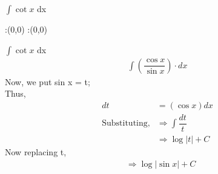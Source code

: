 



\question[3] $\int \cot x $ dx


\watchout

\ifprintanswers
  \begin{marginfigure}
      :(0,0)
      :(0,0)
    \figdrawbegin{}
      \figdrawline [100,101]
    \figdrawend
    \figvisu{\figBoxA}{}{%
    }
    \centerline{\box\figBoxA}
  \end{marginfigure}
\fi 

\begin{solution}[\halfpage]
$\int \cot x $ dx
\begin{align}
\int \left( \dfrac{\cos x}{\sin x} \right) \cdot dx
\end{align}
Now, we put sin x = t;\\
Thus,
\begin{align}
dt &= (\cos x)  dx\\
\text {Substituting},
&\Rightarrow \int \dfrac{dt}{t}\\ 
&\Rightarrow \log |t| + C
\end{align}
Now replacing t,
\begin{align}
&\Rightarrow \log |\sin x| + C
\end{align}
\end{solution}

